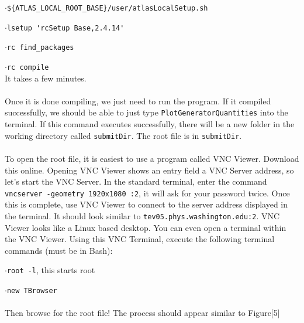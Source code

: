\documentclass[10pt,a4paper]{report}
\begin{document}
$\cdot$\verb|${ATLAS_LOCAL_ROOT_BASE}/user/atlasLocalSetup.sh|

$\cdot$\verb|lsetup 'rcSetup Base,2.4.14'|

$\cdot$\verb|rc find_packages|

$\cdot$\verb|rc compile|\\
It takes a few minutes.\\\\
Once it is done compiling, we just need to run the program. If it compiled successfully, we should be able to just type \verb|PlotGeneratorQuantities| into the terminal. If this command executes successfully, there will be a new folder in the working directory called \verb|submitDir|. The root file is in \verb|submitDir|.\\\\
To open the root file, it is easiest to use a program called VNC Viewer. Download this online. Opening VNC Viewer shows an entry field a VNC Server address, so let's start the VNC Server. In the standard terminal, enter the command \verb|vncserver -geometry 1920x1080 :2|, it will ask for your password twice. Once this is complete, use VNC Viewer to connect to the server address displayed in the terminal. It should look similar to \verb|tev05.phys.washington.edu:2|. VNC Viewer looks like a Linux based desktop. You can even open a terminal within the VNC Viewer. Using this VNC Terminal, execute the following terminal commands (must be in Bash):

$\cdot$\verb|root -l|, this starts root

$\cdot$\verb|new TBrowser|\\\\
Then browse for the root file! The process should appear similar to Figure[5]
\end{document}
